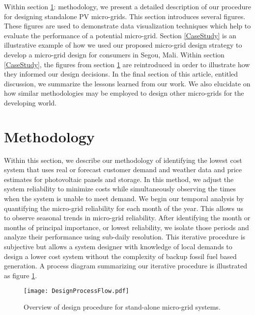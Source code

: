 \documentclass[11p]{article}
\begin{document}
Within section \ref{method}: methodology, we present a detailed description of our procedure for designing standalone PV micro-grids. 
This section introduces several figures.
These figures are used to demonstrate data visualization techniques which help to evaluate the performance of a potential micro-grid.  
Section \ref{CaseStudy} is an illustrative example of how we used our proposed micro-grid design strategy to develop a micro-grid design for consumers in Segou, Mali. 
Within section \ref{CaseStudy}, the figures from section \ref{method} are reintroduced in order to illustrate how they informed our design decisions.
In the final section of this article, entitled discussion, we summarize the lessons learned from our work. 
We also elucidate on how similar methodologies may be employed to design other micro-grids for the developing world. 

\section{Methodology} \label{method}


Within this section, we describe our methodology of identifying the lowest cost system that uses real or forecast customer demand and weather data and price estimates for photovoltaic panels and storage.
In this method, we adjust the system reliability to minimize costs while simultaneously observing the times when the system is unable to meet demand.  
We begin our temporal analysis by quantifying the micro-grid reliability for each month of the year. 
This allows us to observe seasonal trends in micro-grid reliability. 
After identifying the month or months of principal importance, or lowest reliability, we isolate those periods and analyze their performance using sub-daily resolution. 
This iterative procedure is subjective but allows a system designer with knowledge of local demands to design a lower cost system without the complexity of backup fossil fuel based generation.
A process diagram summarizing our iterative procedure is illustrated as figure \ref{FlowChart}. 


\begin{figure}
\centering
\texttt{[image: DesignProcessFlow.pdf]}
\caption{Overview of design procedure for stand-alone micro-grid systems.}

\label{FlowChart}
\end{figure}
\end{document}
